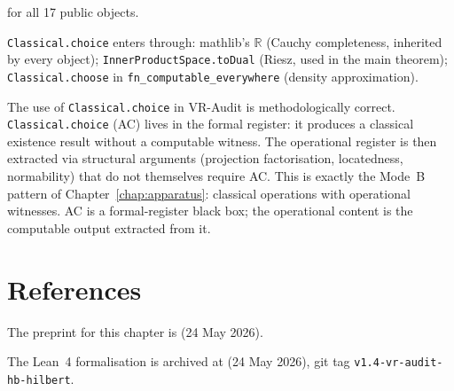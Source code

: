  for all 17 public
objects.

\texttt{Classical.choice} enters through:
mathlib's $\mathbb{R}$ (Cauchy completeness, inherited by every object);
\texttt{InnerProductSpace.toDual} (Riesz, used in the main theorem);
\texttt{Classical.choose} in \texttt{fn\_computable\_everywhere}
(density approximation).

\begin{remark}
\label{rem:AC_methodological}
\leanok
The use of \texttt{Classical.choice} in VR-Audit is methodologically
correct.  \texttt{Classical.choice} (AC) lives in the formal register:
it produces a classical existence result without a computable witness.
The operational register is then extracted via structural arguments
(projection factorisation, locatedness, normability) that do not
themselves require AC.  This is exactly the Mode~B pattern of
Chapter~\ref{chap:apparatus}: classical operations with operational
witnesses.  AC is a formal-register black box; the operational content
is the computable output extracted from it.
\end{remark}

\section{References}
\label{sec:audit_refs}

The preprint for this chapter is
 (24 May 2026).

The Lean~4 formalisation is archived at
 (24 May 2026),
git tag \texttt{v1.4-vr-audit-hb-hilbert}.
